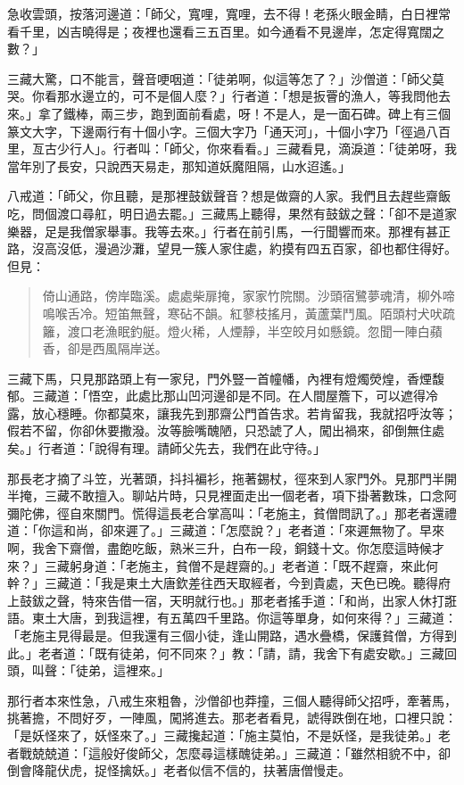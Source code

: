 急收雲頭，按落河邊道：「師父，寬哩，寬哩，去不得！老孫火眼金睛，白日裡常看千里，凶吉曉得是；夜裡也還看三五百里。如今通看不見邊岸，怎定得寬闊之數？」

三藏大驚，口不能言，聲音哽咽道：「徒弟啊，似這等怎了？」沙僧道：「師父莫哭。你看那水邊立的，可不是個人麼？」行者道：「想是扳罾的漁人，等我問他去來。」拿了鐵棒，兩三步，跑到面前看處，呀！不是人，是一面石碑。碑上有三個篆文大字，下邊兩行有十個小字。三個大字乃「通天河」，十個小字乃「徑過八百里，亙古少行人」。行者叫：「師父，你來看看。」三藏看見，滴淚道：「徒弟呀，我當年別了長安，只說西天易走，那知道妖魔阻隔，山水迢遙。」

八戒道：「師父，你且聽，是那裡鼓鈸聲音？想是做齋的人家。我們且去趕些齋飯吃，問個渡口尋舡，明日過去罷。」三藏馬上聽得，果然有鼓鈸之聲：「卻不是道家樂器，足是我僧家舉事。我等去來。」行者在前引馬，一行聞響而來。那裡有甚正路，沒高沒低，漫過沙灘，望見一簇人家住處，約摸有四五百家，卻也都住得好。但見：
\begin{quote}
倚山通路，傍岸臨溪。處處柴扉掩，家家竹院關。沙頭宿鷺夢魂清，柳外啼鳴喉舌冷。短笛無聲，寒砧不韻。紅蓼枝搖月，黃蘆葉鬥風。陌頭村犬吠疏籬，渡口老漁眠釣艇。燈火稀，人煙靜，半空皎月如懸鏡。忽聞一陣白蘋香，卻是西風隔岸送。
\end{quote}

三藏下馬，只見那路頭上有一家兒，門外豎一首幢幡，內裡有燈燭熒煌，香煙馥郁。三藏道：「悟空，此處比那山凹河邊卻是不同。在人間屋簷下，可以遮得冷露，放心穩睡。你都莫來，讓我先到那齋公門首告求。若肯留我，我就招呼汝等；假若不留，你卻休要撒潑。汝等臉嘴醜陋，只恐諕了人，闖出禍來，卻倒無住處矣。」行者道：「說得有理。請師父先去，我們在此守待。」

那長老才摘了斗笠，光著頭，抖抖褊衫，拖著錫杖，徑來到人家門外。見那門半開半掩，三藏不敢擅入。聊站片時，只見裡面走出一個老者，項下掛著數珠，口念阿彌陀佛，徑自來關門。慌得這長老合掌高叫：「老施主，貧僧問訊了。」那老者還禮道：「你這和尚，卻來遲了。」三藏道：「怎麼說？」老者道：「來遲無物了。早來啊，我舍下齋僧，盡飽吃飯，熟米三升，白布一段，銅錢十文。你怎麼這時候才來？」三藏躬身道：「老施主，貧僧不是趕齋的。」老者道：「既不趕齋，來此何幹？」三藏道：「我是東土大唐欽差往西天取經者，今到貴處，天色已晚。聽得府上鼓鈸之聲，特來告借一宿，天明就行也。」那老者搖手道：「和尚，出家人休打誑語。東土大唐，到我這裡，有五萬四千里路。你這等單身，如何來得？」三藏道：「老施主見得最是。但我還有三個小徒，逢山開路，遇水疊橋，保護貧僧，方得到此。」老者道：「既有徒弟，何不同來？」教：「請，請，我舍下有處安歇。」三藏回頭，叫聲：「徒弟，這裡來。」

那行者本來性急，八戒生來粗魯，沙僧卻也莽撞，三個人聽得師父招呼，牽著馬，挑著擔，不問好歹，一陣風，闖將進去。那老者看見，諕得跌倒在地，口裡只說：「是妖怪來了，妖怪來了。」三藏攙起道：「施主莫怕，不是妖怪，是我徒弟。」老者戰兢兢道：「這般好俊師父，怎麼尋這樣醜徒弟。」三藏道：「雖然相貌不中，卻倒會降龍伏虎，捉怪擒妖。」老者似信不信的，扶著唐僧慢走。

